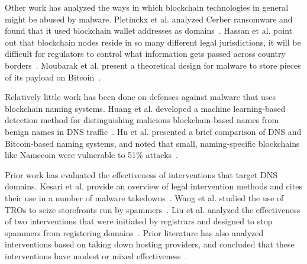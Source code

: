 Other work has analyzed the ways in which blockchain 
technologies in general might be abused by 
malware. Pletinckx et al. analyzed Cerber ransomware and 
found that it used blockchain wallet addresses as 
domains~\cite{plentinckx_cerber_2018}. 
Hassan et al. point out that blockchain nodes reside 
in so many different legal jurisdictions, it will be 
difficult for regulators to control what information gets 
passed across country borders~\cite{hassan_blockchain_2020}. 
Moubarak et al. present a theoretical design for malware to 
store pieces of its payload on 
Bitcoin~\cite{moubarak_developing_2018}.

Relatively little work has been done on defenses against 
malware that uses blockchain naming systems. Huang et al. 
developed a machine learning-based detection 
method for distinguishing malicious blockchain-based names 
from benign names in DNS traffic~\cite{huang2020leopard}.
Hu et al. presented a brief comparison of DNS and 
Bitcoin-based naming systems, and noted that small, 
naming-specific blockchains like Namecoin were vulnerable to 
51\% attacks~\cite{wei2017review}.

Prior work has evaluated the effectiveness of interventions 
that target DNS domains. Kesari et al. provide an overview of 
legal intervention methods and cites their use in a number of 
malware takedowns~\cite{kesari_deterring_2017}. Wang et al. 
studied the use of TROs to seize storefronts run by 
spammers~\cite{wang_search_2014}. Liu et al. analyzed the 
effectiveness of two interventions that were initiated by 
registrars and designed to stop 
spammers from registering 
domains~\cite{liu_registrar_intervention}. Prior literature 
has also analyzed interventions based on taking down hosting 
providers, and concluded that these interventions have modest 
or mixed effectiveness~\cite{bradbury2014testing, 
konte2015aswatch, noroozian_platforms_2019, alrwais_bph}. 